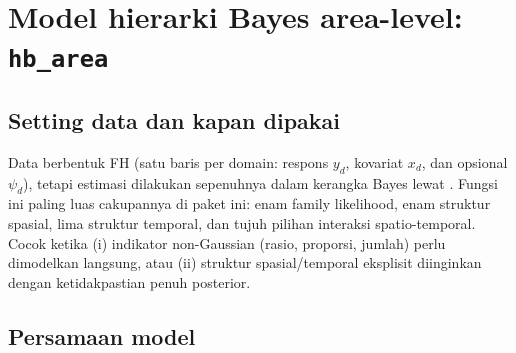 \section{Model hierarki Bayes area-level: \texttt{hb\_area}}\label{sec:hbarea}

\subsection{Setting data dan kapan dipakai}\label{sec:hbarea-setting}

Data berbentuk FH (satu baris per domain: respons $y_d$, kovariat $x_d$, dan
opsional $\psi_d$), tetapi estimasi dilakukan sepenuhnya dalam kerangka Bayes
lewat  \citep{rue2009approximate, lindgren2015bayesian}. Fungsi ini
paling luas cakupannya di paket ini: enam family likelihood, enam struktur
spasial, lima struktur temporal, dan tujuh pilihan interaksi
spatio-temporal. Cocok ketika (i) indikator non-Gaussian (rasio, proporsi,
jumlah) perlu dimodelkan langsung, atau (ii) struktur spasial/temporal
eksplisit diinginkan dengan ketidakpastian penuh posterior.

\subsection{Persamaan model}\label{sec:hbarea-model}

